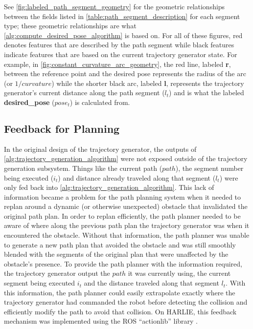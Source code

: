 See \autoref{fig:labeled_path_segment_geometry} for the geometric relationships between the fields listed in \autoref{table:path_segment_description} for each segment type; these geometric relationships are what \autoref{alg:compute_desired_pose_algorithm} is based on. For all of these figures, red denotes features that are described by the path segment while black features indicate features that are based on the current trajectory generator state. For example, in \autoref{fig:constant_curvature_arc_geometry}, the red line, labeled \textbf{r}, between the reference point and the desired pose represents the radius of the arc (or $1/curvature$) while the shorter black arc, labeled \textbf{l}, represents the trajectory generator's current distance along the path segment ($l_t$) and is what the labeled \textbf{desired\_pose} ($pose_t$) is calculated from.

\subsection{Feedback for Planning}\label{subsec:trajectory_generation_actionlib}

In the original design of the trajectory generator, the outputs of \autoref{alg:trajectory_generation_algorithm} were not exposed outside of the trajectory generation subsystem. Things like the current path ($path$), the segment number being executed ($i_t$) and distance already traveled along that segment ($l_t$) were only fed back into \autoref{alg:trajectory_generation_algorithm}. This lack of information became a problem for the path planning system when it needed to replan around a dynamic (or otherwise unexpected) obstacle that invalidated the original path plan. In order to replan efficiently, the path planner needed to be aware of where along the previous path plan the trajectory generator was when it encountered the obstacle. Without that information, the path planner was unable to generate a new path plan that avoided the obstacle and was still smoothly blended with the segments of the original plan that were unaffected by the obstacle's presence. To provide the path planner with the information required, the trajectory generator output the $path$ it was currently using, the current segment being executed $i_t$ and the distance traveled along that segment $l_t$. With this information, the path planner could easily extrapolate exactly where the trajectory generator had commanded the robot before detecting the collision and efficiently modify the path to avoid that collision. On HARLIE, this feedback mechanism was implemented using the ROS ``actionlib'' library \autocite{ActionLibWiki}.

